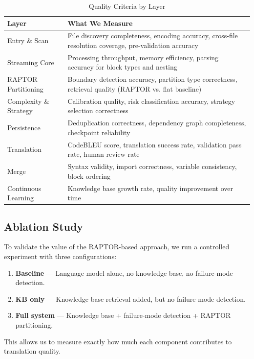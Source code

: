 \documentclass[11pt,a4paper]{article}
\begin{document}
\begin{table}[H]
\centering
\caption{Quality Criteria by Layer}
\renewcommand{\arraystretch}{1.35}
\begin{tabularx}{\textwidth}{@{} l X @{}}
\toprule
\textbf{Layer} & \textbf{What We Measure} \\
\midrule
Entry \& Scan & File discovery completeness, encoding accuracy, cross-file resolution coverage, pre-validation accuracy \\
Streaming Core & Processing throughput, memory efficiency, parsing accuracy for block types and nesting \\
RAPTOR Partitioning & Boundary detection accuracy, partition type correctness, retrieval quality (RAPTOR vs. flat baseline) \\
Complexity \& Strategy & Calibration quality, risk classification accuracy, strategy selection correctness \\
Persistence & Deduplication correctness, dependency graph completeness, checkpoint reliability \\
Translation & CodeBLEU score, translation success rate, validation pass rate, human review rate \\
Merge & Syntax validity, import correctness, variable consistency, block ordering \\
Continuous Learning & Knowledge base growth rate, quality improvement over time \\
\bottomrule
\end{tabularx}
\end{table}

\subsection{Ablation Study}

To validate the value of the RAPTOR-based approach, we run a controlled experiment with three configurations:

\begin{enumerate}[leftmargin=1.5em]
    \item \textbf{Baseline} — Language model alone, no knowledge base, no failure-mode detection.
    \item \textbf{KB only} — Knowledge base retrieval added, but no failure-mode detection.
    \item \textbf{Full system} — Knowledge base + failure-mode detection + RAPTOR partitioning.
\end{enumerate}

This allows us to measure exactly how much each component contributes to translation quality.
\end{document}

